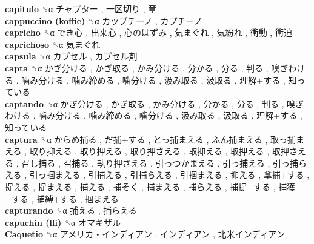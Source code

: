 \textbf{capitulo} ␝α   チャプター ,  一区切り ,  章   \\
\textbf{cappuccino (koffie)} ␝α   カップチーノ ,  カプチーノ   \\
\textbf{capricho} ␝α   でき心 ,  出来心 ,  心のはずみ ,  気まぐれ ,  気紛れ ,  衝動 ,  衝迫   \\
\textbf{caprichoso} ␝α   気まぐれ   \\
\textbf{capsula} ␝α   カプセル ,  カプセル剤   \\
\textbf{capta} ␝α   かぎ分ける ,  かぎ取る ,  かみ分ける ,  分かる ,  分る ,  判る ,  嗅ぎわける ,  噛み分ける ,  噛み締める ,  噛分ける ,  汲み取る ,  汲取る ,  理解+する ,  知っている   \\
\textbf{captando} ␝α   かぎ分ける ,  かぎ取る ,  かみ分ける ,  分かる ,  分る ,  判る ,  嗅ぎわける ,  噛み分ける ,  噛み締める ,  噛分ける ,  汲み取る ,  汲取る ,  理解+する ,  知っている   \\
\textbf{captura} ␝α   からめ捕る ,  だ捕+する ,  とっ捕まえる ,  ふん捕まえる ,  取っ捕まえる ,  取り抑える ,  取り押える ,  取り押さえる ,  取抑える ,  取押える ,  取押さえる ,  召し捕る ,  召捕る ,  執り押さえる ,  引っつかまえる ,  引っ捕える ,  引っ捕らえる ,  引っ掴まえる ,  引捕える ,  引捕らえる ,  引掴まえる ,  抑える ,  拿捕+する ,  捉える ,  捉まえる ,  捕える ,  捕そく ,  捕まえる ,  捕らえる ,  捕捉+する ,  捕獲+する ,  捕縛+する ,  掴まえる   \\
\textbf{capturando} ␝α   捕える ,  捕らえる   \\
\textbf{capuchin (fli)} ␝α   オマキザル   \\
\textbf{Caquetio} ␝α   アメリカ・インディアン ,  インディアン ,  北米インディアン   \\
